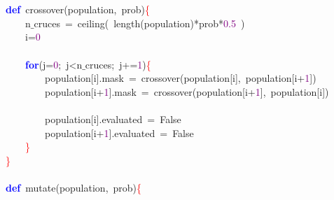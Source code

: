 \mbox{} \\
\mbox{} \\
\mbox{}\textbf{\textcolor{Blue}{def}}\ crossover\textcolor{BrickRed}{(}population\textcolor{BrickRed}{,}\ prob\textcolor{BrickRed}{)}\textcolor{Red}{\{} \\
\mbox{}\ \ \ \ n$\_$cruces\ \textcolor{BrickRed}{=}\ ceiling\textcolor{BrickRed}{(}\ length\textcolor{BrickRed}{(}population\textcolor{BrickRed}{)*}prob\textcolor{BrickRed}{*}\textcolor{Purple}{0.5}\ \textcolor{BrickRed}{)} \\
\mbox{}\ \ \ \ i\textcolor{BrickRed}{=}\textcolor{Purple}{0} \\
\mbox{} \\
\mbox{}\ \ \ \ \textbf{\textcolor{Blue}{for}}\textcolor{BrickRed}{(}j\textcolor{BrickRed}{=}\textcolor{Purple}{0}\textcolor{BrickRed}{;}\ j\textcolor{BrickRed}{\textless{}}n$\_$cruces\textcolor{BrickRed}{;}\ j\textcolor{BrickRed}{+=}\textcolor{Purple}{1}\textcolor{BrickRed}{)}\textcolor{Red}{\{} \\
\mbox{}\ \ \ \ \ \ \ \ population\textcolor{BrickRed}{[}i\textcolor{BrickRed}{].}mask\ \textcolor{BrickRed}{=}\ crossover\textcolor{BrickRed}{(}population\textcolor{BrickRed}{[}i\textcolor{BrickRed}{],}\ population\textcolor{BrickRed}{[}i\textcolor{BrickRed}{+}\textcolor{Purple}{1}\textcolor{BrickRed}{])} \\
\mbox{}\ \ \ \ \ \ \ \ population\textcolor{BrickRed}{[}i\textcolor{BrickRed}{+}\textcolor{Purple}{1}\textcolor{BrickRed}{].}mask\ \textcolor{BrickRed}{=}\ crossover\textcolor{BrickRed}{(}population\textcolor{BrickRed}{[}i\textcolor{BrickRed}{+}\textcolor{Purple}{1}\textcolor{BrickRed}{],}\ population\textcolor{BrickRed}{[}i\textcolor{BrickRed}{])} \\
\mbox{} \\
\mbox{}\ \ \ \ \ \ \ \ population\textcolor{BrickRed}{[}i\textcolor{BrickRed}{].}evaluated\ \textcolor{BrickRed}{=}\ False \\
\mbox{}\ \ \ \ \ \ \ \ population\textcolor{BrickRed}{[}i\textcolor{BrickRed}{+}\textcolor{Purple}{1}\textcolor{BrickRed}{].}evaluated\ \textcolor{BrickRed}{=}\ False \\
\mbox{}\ \ \ \ \textcolor{Red}{\}} \\
\mbox{}\textcolor{Red}{\}} \\
\mbox{} \\
\mbox{}\textbf{\textcolor{Blue}{def}}\ mutate\textcolor{BrickRed}{(}population\textcolor{BrickRed}{,}\ prob\textcolor{BrickRed}{)}\textcolor{Red}{\{} \\
